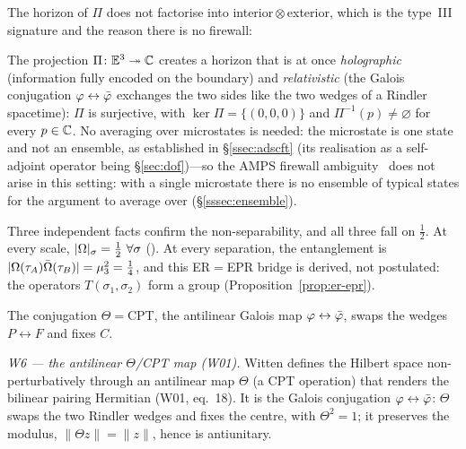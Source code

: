 The horizon of $\Pi$ does not factorise into interior${}\otimes{}$exterior, which is the
type~III signature and the reason there is no firewall:
\begin{proposition}\label{prop:obs-nofirewall}
The projection $\Pi\colon\mathbb{E}^{3}\twoheadrightarrow\mathbb{C}$ creates a horizon that is at
once \emph{holographic} (information fully encoded on the boundary) and
\emph{relativistic} (the Galois conjugation $\varphi\leftrightarrow\bar{\varphi}$
exchanges the two sides like the two wedges of a Rindler spacetime): $\Pi$ is
surjective, with $\ker\Pi=\{(0,0,0)\}$ and $\Pi^{-1}(p)\neq\varnothing$ for every
$p\in\mathbb{C}$. No averaging over microstates is needed: the microstate is one state and not an ensemble, as established in \S\ref{ssec:adscft} (its realisation as a self-adjoint operator being \S\ref{sec:dof})---so the AMPS firewall ambiguity~\cite{AMPS13} does not arise in this setting: with a single microstate there is no ensemble of typical states for the argument to average over (\S\ref{sssec:ensemble}).

\end{proposition}
Three independent facts confirm the non-separability, and all three fall on $\tfrac12$. At
every scale, $|\Om|_\sigma=\tfrac12\ \forall\sigma$ (). At
every separation, the entanglement is $|\Omega(\tau_A)\bar{\Omega}(\tau_B)|=\mu_3^2=\tfrac14$, and
this ER${=}$EPR bridge is derived, not postulated: the operators $T(\sigma_1,\sigma_2)$ form
a group (Proposition~\ref{prop:er-epr}).


The conjugation $\Theta={}$CPT, the antilinear Galois map $\varphi\leftrightarrow\bar{\varphi}$,
swaps the wedges $P\leftrightarrow F$ and fixes $C$.

\emph{W6 --- the antilinear $\Theta$/CPT map (W01).} Witten defines the Hilbert space
non-perturbatively through an antilinear map $\Theta$ (a CPT operation) that renders the
bilinear pairing Hermitian (W01, eq.~18). It is the Galois conjugation
$\varphi\leftrightarrow\bar{\varphi}$: $\Theta$ swaps the two Rindler wedges and fixes the
centre, with $\Theta^2=1$; it preserves the modulus, $\lVert\Theta z\rVert=\lVert z\rVert$, hence is antiunitary.


